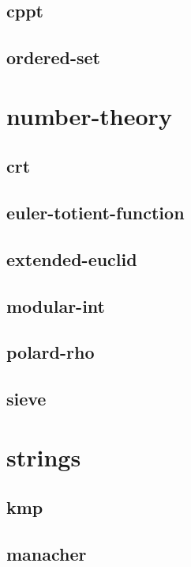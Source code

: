 \documentclass[a4paper, twocolumn]{article}
\begin{document}
\subsection{cppt}

\subsection{ordered-set}

\section{number-theory}
\subsection{crt}

\subsection{euler-totient-function}

\subsection{extended-euclid}

\subsection{modular-int}

\subsection{polard-rho}

\subsection{sieve}

\section{strings}
\subsection{kmp}

\subsection{manacher}

\end{document}
